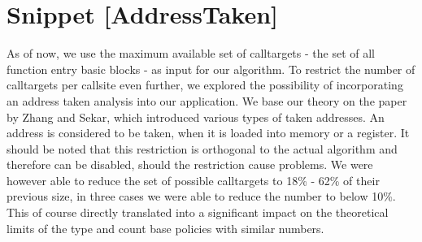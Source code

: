 \begin{table}
		\caption {Table shows the ability of inferring the voidness for callsites and calltargets exhibited by our implementation of the COUNT policy. }
	\label{tbl:baselinecompvoid}
\end{table}

\chapter{Snippet [AddressTaken]}

As of now, we use the maximum available set of calltargets - the set of all function entry basic blocks - as input for our algorithm. To restrict the number of calltargets per callsite even further, we explored the possibility of incorporating an address taken analysis into our application. We base our theory on the paper by Zhang and Sekar\cite{ZhangSekar00}, which introduced various types of taken addresses. An address is considered to be taken, when it is loaded into memory or a register. It should be noted that this restriction is orthogonal to the actual algorithm and therefore can be disabled, should the restriction cause problems. We were however able to reduce the set of possible calltargets to 18\% - 62\% of their previous size, in three cases we were able to reduce the number to below 10\%. This of course directly translated into a significant impact on the theoretical limits of the type and count base policies with similar numbers.


